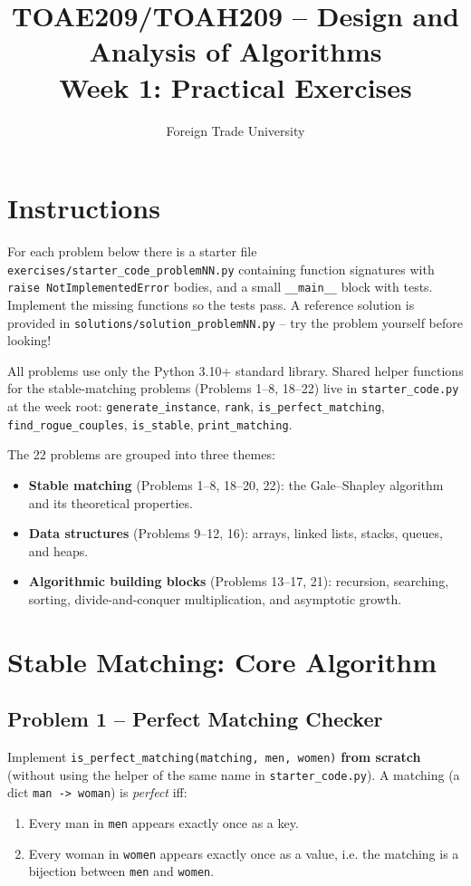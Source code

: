 \documentclass[11pt]{article}
\title{TOAE209/TOAH209 -- Design and Analysis of Algorithms\\[4pt]
\large Week 1: Practical Exercises}
\author{Foreign Trade University}
\date{}
\begin{document}
\maketitle

\section*{Instructions}

For each problem below there is a starter file
\texttt{exercises/starter\_code\_problemNN.py} containing function signatures with
\texttt{raise NotImplementedError} bodies, and a small \texttt{\_\_main\_\_} block with
tests. Implement the missing functions so the tests pass. A reference solution is
provided in \texttt{solutions/solution\_problemNN.py} -- try the problem yourself before
looking!

All problems use only the Python 3.10+ standard library. Shared helper functions for the
stable-matching problems (Problems 1--8, 18--22) live in \texttt{starter\_code.py} at the
week root: \texttt{generate\_instance}, \texttt{rank}, \texttt{is\_perfect\_matching},
\texttt{find\_rogue\_couples}, \texttt{is\_stable}, \texttt{print\_matching}.

The 22 problems are grouped into three themes:
\begin{itemize}
    \item \textbf{Stable matching} (Problems 1--8, 18--20, 22): the Gale--Shapley
    algorithm and its theoretical properties.
    \item \textbf{Data structures} (Problems 9--12, 16): arrays, linked lists, stacks,
    queues, and heaps.
    \item \textbf{Algorithmic building blocks} (Problems 13--17, 21): recursion, searching,
    sorting, divide-and-conquer multiplication, and asymptotic growth.
\end{itemize}

\newpage
\section{Stable Matching: Core Algorithm}

\subsection*{Problem 1 -- Perfect Matching Checker}

Implement \texttt{is\_perfect\_matching(matching, men, women)} \textbf{from scratch}
(without using the helper of the same name in \texttt{starter\_code.py}). A matching
(a dict \texttt{man -> woman}) is \emph{perfect} iff:
\begin{enumerate}
    \item Every man in \texttt{men} appears exactly once as a key.
    \item Every woman in \texttt{women} appears exactly once as a value, i.e. the matching
    is a bijection between \texttt{men} and \texttt{women}.
\end{enumerate}
\end{document}

